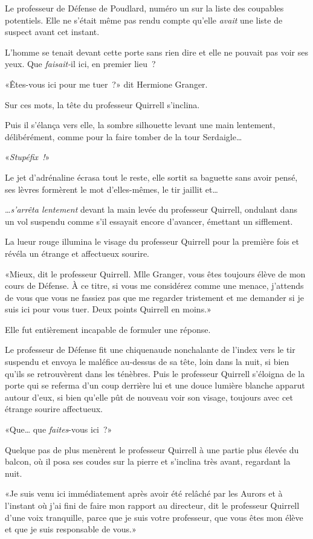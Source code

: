 Le professeur de Défense de Poudlard, numéro un sur la liste des coupables potentiels. Elle ne s'était même pas rendu compte qu'elle \emph{avait} une liste de suspect avant cet instant.

L'homme se tenait devant cette porte sans rien dire et elle ne pouvait pas voir ses yeux. Que \emph{faisait-}il ici, en premier lieu~?

«Êtes-vous ici pour me tuer~?» dit Hermione Granger.

Sur ces mots, la tête du professeur Quirrell s'inclina.

Puis il s'élança vers elle, la sombre silhouette levant une main lentement, délibérément, comme pour la faire tomber de la tour Serdaigle…

«\emph{Stupéfix~!}»

Le jet d'adrénaline écrasa tout le reste, elle sortit sa baguette sans avoir pensé, ses lèvres formèrent le mot d'elles-mêmes, le tir jaillit et…

…\emph{s'arrêta lentement} devant la main levée du professeur Quirrell, ondulant dans un vol suspendu comme s'il essayait encore d'avancer, émettant un sifflement.

La lueur rouge illumina le visage du professeur Quirrell pour la première fois et révéla un étrange et affectueux sourire.

«Mieux, dit le professeur Quirrell. Mlle Granger, vous êtes toujours élève de mon cours de Défense. À ce titre, si vous me considérez comme une menace, j'attends de vous que vous ne fassiez pas que me regarder tristement et me demander si je suis ici pour vous tuer. Deux points Quirrell en moins.»

Elle fut entièrement incapable de formuler une réponse.

Le professeur de Défense fit une chiquenaude nonchalante de l'index vers le tir suspendu et envoya le maléfice au-dessus de sa tête, loin dans la nuit, si bien qu'ils se retrouvèrent dans les ténèbres. Puis le professeur Quirrell s'éloigna de la porte qui se referma d'un coup derrière lui et une douce lumière blanche apparut autour d'eux, si bien qu'elle pût de nouveau voir son visage, toujours avec cet étrange sourire affectueux.

«Que… que \emph{faites}-vous ici~?»

Quelque pas de plus menèrent le professeur Quirrell à une partie plus élevée du balcon, où il posa ses coudes sur la pierre et s'inclina très avant, regardant la nuit.

«Je suis venu ici immédiatement après avoir été relâché par les Aurors et à l'instant où j'ai fini de faire mon rapport au directeur, dit le professeur Quirrell d'une voix tranquille, parce que je suis votre professeur, que vous êtes mon élève et que je suis responsable de vous.»

